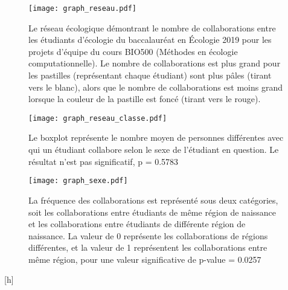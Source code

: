 \documentclass[twoside,twocolumn]{article}
\begin{document}
\begin{figure}[h]
\texttt{[image: graph\_reseau.pdf]}
\caption {Le réseau écologique démontrant le nombre de collaborations entre les étudiants d’écologie du baccalauréat en Écologie 2019 pour les projets d’équipe du cours BIO500 (Méthodes en écologie computationnelle). Le nombre de collaborations est plus grand pour les pastilles (représentant chaque étudiant) sont plus pâles (tirant vers le blanc), alors que le nombre de collaborations est moins grand lorsque la couleur de la pastille est foncé (tirant vers le rouge).}
\end{figure}


\begin{figure}[h]
\texttt{[image: graph\_reseau\_classe.pdf]}
\caption {Le boxplot représente le nombre moyen de personnes différentes avec qui un étudiant collabore selon le sexe de l’étudiant en question. Le résultat n’est pas significatif, p = 0.5783}
\end{figure}

\begin{figure}[h]
\texttt{[image: graph\_sexe.pdf]}
\caption {La fréquence des collaborations est représenté sous deux catégories, soit les collaborations entre étudiants de même région de naissance et les collaborations entre étudiants de différente région de naissance. La valeur de 0 représente les collaborations de régions différentes, et la valeur de 1 représentent les collaborations entre même région, pour une valeur significative de p-value = 0.0257}
\end{figure}


 [h]
\caption{Le nombre de collaborations entre les étudiants de diète semblable en comparaison avec le nombre de collaborations entre les étudiants de diètes différentes. 421 liens sont de types omnivore-omnivore, 133 liens entre végétarien-omnivore, et 52 liens végétarien-végétarien. Il y avait 20 personnes de diète omnivore et 6 personnes de diète végétarienne au total.}



\end{document}
